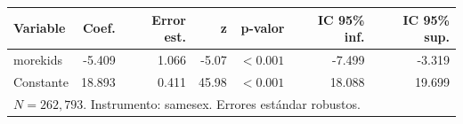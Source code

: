 
\begin{tabular}{lrrrrrr}
\toprule
Variable & Coef. & Error est. & z & p-valor & IC 95\% inf. & IC 95\% sup.\\
\midrule
morekids & -5.409 & 1.066 & -5.07 & $<0.001$ & -7.499 & -3.319\\
Constante & 18.893 & 0.411 & 45.98 & $<0.001$ & 18.088 & 19.699\\
\midrule
\multicolumn{7}{l}{$N=262{,}793$. Instrumento: samesex. Errores estándar robustos.}\\
\bottomrule
\end{tabular}
